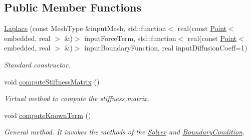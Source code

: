 \subsection*{Public Member Functions}
\begin{DoxyCompactItemize}
\item 
\hyperlink{class_laplace_a12701fdb17859f9348e4cd4d819a95e3}{Laplace} (const Mesh\+Type \&input\+Mesh, std\+::function$<$ real(const \hyperlink{class_point}{Point}$<$ embedded, real $>$ \&)$>$ input\+Force\+Term, std\+::function$<$ real(const \hyperlink{class_point}{Point}$<$ embedded, real $>$ \&)$>$ input\+Boundary\+Function, real input\+Diffusion\+Coeff=1)
\begin{DoxyCompactList}\small\item\em Standard constructor. \end{DoxyCompactList}\item 
void \hyperlink{class_laplace_af7da15475d7204175e8f34fbc04091d5}{compute\+Stiffness\+Matrix} ()\hypertarget{class_laplace_af7da15475d7204175e8f34fbc04091d5}{}\label{class_laplace_af7da15475d7204175e8f34fbc04091d5}

\begin{DoxyCompactList}\small\item\em Virtual method to compute the stiffness matrix. \end{DoxyCompactList}\item 
void \hyperlink{class_laplace_aa1b02086ed9e87c3aabc1b70a4ad7a82}{compute\+Known\+Term} ()\hypertarget{class_laplace_aa1b02086ed9e87c3aabc1b70a4ad7a82}{}\label{class_laplace_aa1b02086ed9e87c3aabc1b70a4ad7a82}

\begin{DoxyCompactList}\small\item\em General method. It invokes the methods of the \hyperlink{class_solver}{Solver} and \hyperlink{class_boundary_condition}{Boundary\+Condition}. \end{DoxyCompactList}\end{DoxyCompactItemize}

